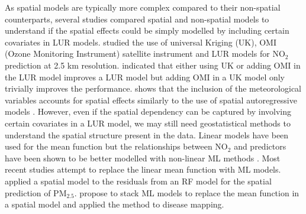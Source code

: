 \documentclass{article}
\begin{document}

As spatial models are typically more complex compared to their non-spatial counterparts, several studies compared spatial and non-spatial models to understand if the spatial effects could be simply modelled by including certain covariates in LUR models. \cite{young2016satellite} studied the use of universal Kriging (UK), OMI (Ozone Monitoring Instrument) satellite instrument \citep{OMI} and LUR models for NO$_2$ prediction at 2.5 km resolution. \cite{young2016satellite} indicated that either using UK or adding OMI in the LUR model improves a LUR model but adding OMI in a UK model only trivially improves the performance. \cite{BERTAZZON20159} shows that the inclusion of the meteorological variables accounts for spatial effects similarly to the use of spatial autoregressive models \citep{anselin2001spatial}. However, even if the spatial dependency can be captured by involving certain covariates in a LUR model, we may still need geostatistical methods to understand the spatial structure present in the data. Linear models have been used for the mean function but the relationships between NO$_2$ and predictors have been shown to be better modelled with non-linear ML methods \citep{luglobal}. Most recent studies attempt to replace the linear mean function with ML models. \cite{liu2020integrate} applied a spatial model to the residuals from an RF model for the spatial prediction of PM$_{2.5}$. \cite{stackinla} propose to stack ML models to replace the mean function in a spatial model and applied the method to disease mapping. 
\end{document}
